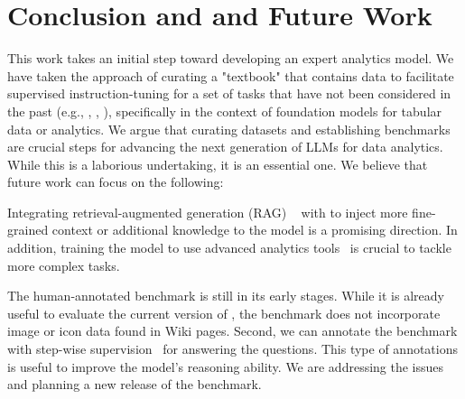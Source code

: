 \section{Conclusion and and Future Work}
This work takes an initial step toward developing an expert analytics  model. We have taken the approach of curating a "textbook" that contains data to facilitate supervised instruction-tuning for a set of tasks that have not been considered in the past (e.g., \texttotable, \tabletotext, \datadiscovery), specifically in the context of foundation models for tabular data or analytics.  We argue that curating datasets and establishing benchmarks are crucial steps for advancing the next generation of LLMs for data analytics. While this is a laborious undertaking, it is an essential one. 
%
We believe that future work can focus on the following:

 Integrating retrieval-augmented generation (RAG) ~\citep{lewis2020rag} with \modelname to inject more fine-grained context or additional knowledge to the model is a promising direction. In addition, training the model to use advanced analytics tools~\citep{dseval, InfiAgent-DABench, datainterpreter} is crucial to tackle more complex tasks.

 The human-annotated \wikipage benchmark is still in its early stages. While it is already useful to evaluate the current version of \modelname, the benchmark does not incorporate image or icon data found in Wiki pages. Second, we can  annotate the benchmark with step-wise supervision~\citep{lightman2024lets} for answering the questions. This type of annotations is useful to improve the model's reasoning ability. We are addressing the issues and planning a new release of the benchmark.


